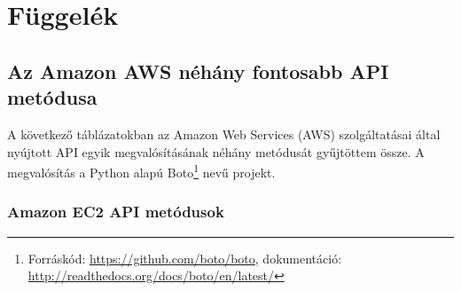 \appendix
\chapter*{Függelék}
\setcounter{chapter}{6}  %
\setcounter{equation}{0} %

\section{Az Amazon AWS néhány fontosabb API metódusa}\label{sec:appendix_amazonaws}

A következő táblázatokban az Amazon Web Services (AWS) szolgáltatásai által nyújtott API egyik megvalósításának néhány metódusát gyűjtöttem össze. A megvalósítás a Python alapú Boto\footnote{Forráskód: \href{https://github.com/boto/boto}{https://github.com/boto/boto}, dokumentáció: \href{http://readthedocs.org/docs/boto/en/latest/}{http://readthedocs.org/docs/boto/en/latest/}} nevű projekt.

\subsection{Amazon EC2 API metódusok}

